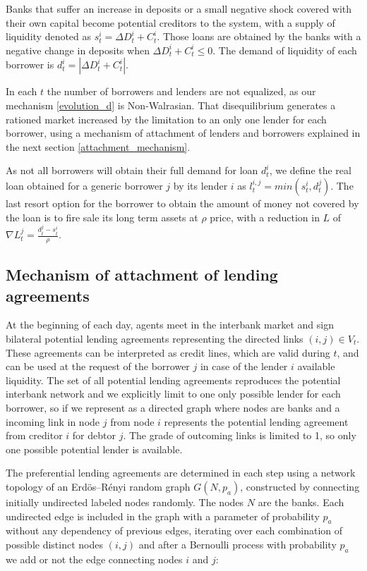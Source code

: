 \documentclass{article}
\begin{document}
Banks that suffer an increase in deposits or a small negative shock covered with their own capital become potential creditors to the system, with a supply of liquidity denoted as $s^i_t=\Delta D^i_t + C^i_t$. Those loans are obtained by the banks with a negative change in deposits when $\Delta D^i_t + C^i_t \leq 0$. The demand of liquidity of each borrower is $d^i_t=|\Delta D^i_t + C^i_t |$.

In each $t$ the number of borrowers and lenders are not equalized, as our mechanism \ref{evolution_d} is Non-Walrasian. That disequilibrium generates a rationed market increased by the limitation to an only one lender for each borrower, using a mechanism of attachment of lenders and borrowers explained in the next section \ref{attachment_mechanism}.  

As not all borrowers will obtain their full demand for loan $d^i_t$, we define the real loan obtained for a generic borrower $j$ by its lender $i$ as $l^{i,j}_t=min(s^i_t,d^j_t)$. The last resort option for the borrower to obtain the amount of money not covered by the loan is to fire sale its long term assets at $\rho$ price, with a reduction in $L$ of $\nabla L^j_t=\frac{d^j_t-s^i_t}{\rho}$.

\subsection*{Mechanism of attachment of lending agreements}
\label{attachment_mechanism}
At the beginning of each day, agents meet in the interbank market and sign bilateral potential lending
agreements representing the directed links $(i, j) \in V_t$. These agreements can be interpreted as credit lines, which are valid during $t$, and can be used at the request of the borrower $j$ in
case of the lender $i$ available liquidity. The set of all potential lending agreements reproduces the potential interbank network and we explicitly limit to one only possible lender for each borrower, so if we represent as a directed graph where nodes are banks and a incoming link in node $j$ from node $i$ represents the potential lending agreement from creditor $i$ for debtor $j$. The grade of outcoming links is limited to 1, so only one possible potential lender is available.


The preferential lending agreements are determined in each step using a network topology of an Erdös–Rényi random graph $G(N,p_a)$, constructed by connecting initially undirected labeled nodes randomly. 
The nodes $N$ are the banks. Each undirected edge is included in the graph with a parameter of probability $p_a$ without any dependency of previous edges, iterating over each combination of possible distinct nodes $(i,j)$ and after a Bernoulli process with probability $p_a$ we add or not the edge connecting nodes $i$ and $j$:
\end{document}

